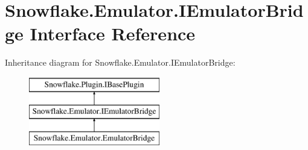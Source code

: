 \hypertarget{interface_snowflake_1_1_emulator_1_1_i_emulator_bridge}{}\section{Snowflake.\+Emulator.\+I\+Emulator\+Bridge Interface Reference}
\label{interface_snowflake_1_1_emulator_1_1_i_emulator_bridge}
Inheritance diagram for Snowflake.\+Emulator.\+I\+Emulator\+Bridge\+:\begin{figure}[H]
\begin{center}
\leavevmode
\includegraphics[height=3.000000cm]{interface_snowflake_1_1_emulator_1_1_i_emulator_bridge}
\end{center}
\end{figure}
